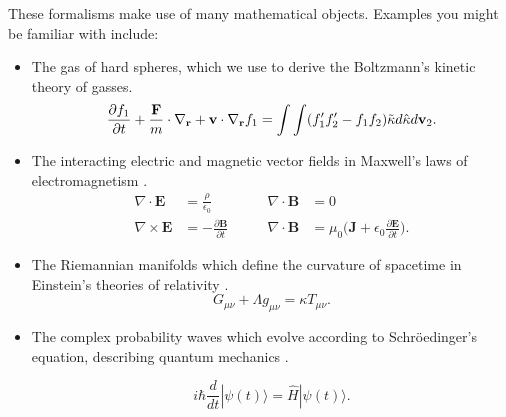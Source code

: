 
These formalisms make use of many mathematical objects. Examples you might be familiar with include:
\begin{itemize}
\item The gas of hard spheres, which we use to derive the Boltzmann's kinetic theory of gasses.  
\begin{equation}
	\label{hard_spheres}
	\frac{\partial f_1}{\partial t} + \frac{\bold{F}}{m}\cdot\nabla_\bold{r} + \bold{v} \cdot \nabla_\bold{r} f_1 =  \int \int (f'_1f'_2 - f_1 f_2) \tilde \kappa d \hat \kappa d \bold{v}_2.
\end{equation}

\item The interacting electric and magnetic vector fields in Maxwell's laws of electromagnetism \cite{griffiths2017}.
\begin{equation}
	\begin{aligned}
		\nabla \cdot  \mathbf{E} &= \frac{\rho}{\epsilon_0} \qquad & \nabla \cdot  \mathbf{B} &= 0 \\
		\nabla \times  \mathbf{E} &= -\frac{\partial \mathbf{B}}{\partial t} \qquad &  \nabla \cdot  \mathbf{B} &= \mu_0 \big(\mathbf{J} + \epsilon_0 \frac{\partial \mathbf{E} } {\partial t }\big).
	\end{aligned}
\end{equation}

\item The Riemannian manifolds which define the curvature of spacetime in Einstein's theories of relativity \cite{carroll2019}.
\begin{equation}
	G_{\mu \nu} + \Lambda g_{\mu \nu} = \kappa T_{\mu \nu}.
\end{equation}

\item The complex probability waves which evolve according to Schr\"oedinger's equation, describing quantum mechanics \cite{griffiths1994}. 

\begin{equation}
	i \hbar \frac{d}{dt} | \psi (t) \rangle = \hat {H} | \psi (t) \rangle .
\end{equation}
\end{itemize}

